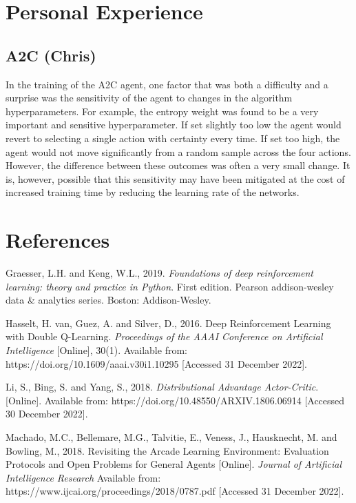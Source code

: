 \documentclass{article}
\begin{document}
\section{Personal Experience}

\subsection{A2C (Chris)}

In the training of the A2C agent, one factor that was both a difficulty and a surprise was the sensitivity of the agent to changes in the algorithm hyperparameters. For example, the entropy weight was found to be a very important and sensitive hyperparameter. If set slightly too low the agent would revert to selecting a single action with certainty every time. If set too high, the agent would not move significantly from a random sample across the four actions. However, the difference between these outcomes was often a very small change. It is, however, possible that this sensitivity may have been mitigated at the cost of increased training time by reducing the learning rate of the networks.

\section*{References}

Graesser, L.H. and Keng, W.L., 2019. \emph{Foundations of deep reinforcement learning: theory and practice in Python}. First edition. Pearson addison-wesley data \& analytics series. Boston: Addison-Wesley.

Hasselt, H. van, Guez, A. and Silver, D., 2016. Deep Reinforcement Learning with Double Q-Learning. \emph{Proceedings of the AAAI Conference on Artificial Intelligence} [Online], 30(1). Available from: https://doi.org/10.1609/aaai.v30i1.10295 [Accessed 31 December 2022].

Li, S., Bing, S. and Yang, S., 2018. \emph{Distributional Advantage Actor-Critic}. [Online]. Available from: https://doi.org/10.48550/ARXIV.1806.06914 [Accessed 30 December 2022].

Machado, M.C., Bellemare, M.G., Talvitie, E., Veness, J., Hausknecht, M. and Bowling, M., 2018. Revisiting the Arcade Learning Environment: Evaluation Protocols and Open Problems for General Agents [Online]. \emph{Journal of Artificial Intelligence Research}  Available from: https://www.ijcai.org/proceedings/2018/0787.pdf  [Accessed 31 December 2022].
\end{document}
